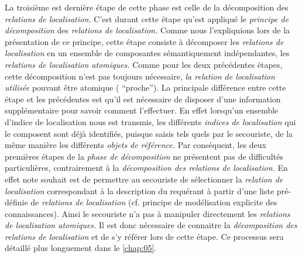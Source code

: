 La troisième est dernière étape de cette phase est celle de la
décomposition des \emph{relations de localisation.} C'est durant cette
étape qu'est appliqué le \emph{principe de décomposition} des
\emph{relations de localisation.} Comme nous l'expliquions lors de la
présentation de ce principe, cette étape consiste à décomposer les
\emph{relations de localisation} en un ensemble de composantes
sémantiquement indépendantes, les \emph{relations de localisation
  atomiques.} Comme pour les deux précédentes étapes, cette
décomposition n'est pas toujours nécessaire, \emph{la relation de
  localisation utilisée} pouvant être atomique (\eg
\enquote{proche}). La principale différence entre cette étape et les
précédentes est qu'il est nécessaire de disposer d'une information
supplémentaire pour savoir comment l'effectuer. En effet lorsqu'un
ensemble d'indice de localisation nous est transmis, les différents
\emph{indices de localisation} qui le composent sont déjà identifiés,
puisque saisis tels quels par le secouriste, de la même manière les
différents \emph{objets de référence.} Par conséquent, les deux
premières étapes de la \emph{phase de décomposition} ne présentent pas
de difficultés particulières, contrairement à la \emph{décomposition
  des relations de localisation.} En effet note souhait est de
permettre au secouriste de sélectionner la \emph{relation de
  localisation} correspondant à la description du requérant à partir
d'une liste pré-définie de \emph{relations de localisation}
(cf. principe de modélisation explicite des connaissances). Ainsi le
secouriste n'a pas à manipuler directement les \emph{relations de
  localisation atomiques.} Il est donc nécessaire de connaitre la
\emph{décomposition des relations de localisation} et de s'y référer
lors de cette étape. Ce processus sera détaillé plus longuement dans
le \autoref{chap:05}.



